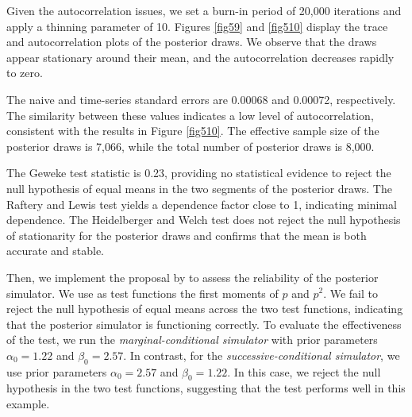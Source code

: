 \begin{enumerate}[leftmargin=*]
Given the autocorrelation issues, we set a burn-in period of 20,000 iterations and apply a thinning parameter of 10. Figures \ref{fig59} and \ref{fig510} display the trace and autocorrelation plots of the posterior draws. We observe that the draws appear stationary around their mean, and the autocorrelation decreases rapidly to zero.

The naive and time-series standard errors are 0.00068 and 0.00072, respectively. The similarity between these values indicates a low level of autocorrelation, consistent with the results in Figure \ref{fig510}. The effective sample size of the posterior draws is 7,066, while the total number of posterior draws is 8,000.

The Geweke test statistic is 0.23, providing no statistical evidence to reject the null hypothesis of equal means in the two segments of the posterior draws. The Raftery and Lewis test yields a dependence factor close to 1, indicating minimal dependence. The Heidelberger and Welch test does not reject the null hypothesis of stationarity for the posterior draws and confirms that the mean is both accurate and stable.

Then, we implement the proposal by \cite{geweke2004getting} to assess the reliability of the posterior simulator. We use as test functions the first moments of $p$ and $p^2$. We fail to reject the null hypothesis of equal means across the two test functions, indicating that the posterior simulator is functioning correctly. To evaluate the effectiveness of the test, we run the \textit{marginal-conditional simulator} with prior parameters $\alpha_{0} = 1.22$ and $\beta_{0} = 2.57$. In contrast, for the \textit{successive-conditional simulator}, we use prior parameters $\alpha_{0} = 2.57$ and $\beta_{0} = 1.22$. In this case, we reject the null hypothesis in the two test functions, suggesting that the test performs well in this example.


\end{enumerate}
